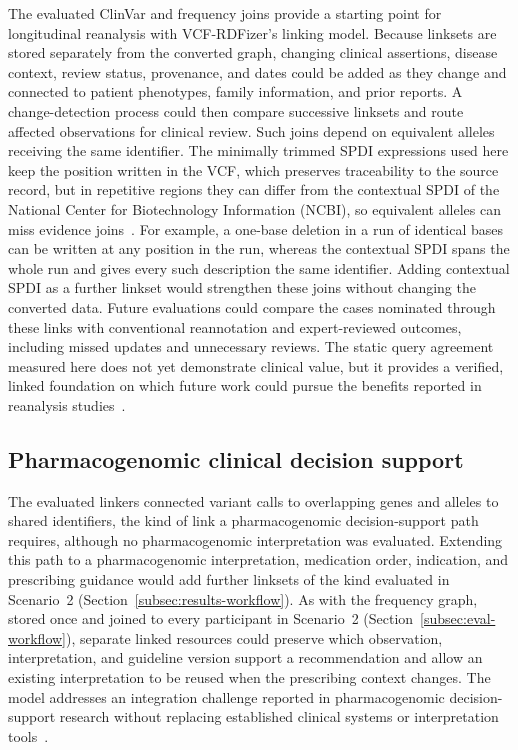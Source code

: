 \documentclass[pdflatex,sn-mathphys-num,referee]{sn-jnl}
\begin{document}
The evaluated ClinVar and frequency joins provide a starting point for longitudinal reanalysis with VCF-RDFizer's linking model.
Because linksets are stored separately from the converted graph, changing clinical assertions, disease context, review status, provenance, and dates could be added as they change and connected to patient phenotypes, family information, and prior reports.
A change-detection process could then compare successive linksets and route affected observations for clinical review.
Such joins depend on equivalent alleles receiving the same identifier.
The minimally trimmed SPDI expressions used here keep the position written in the VCF, which preserves traceability to the source record, but in repetitive regions they can differ from the contextual SPDI of the National Center for Biotechnology Information (NCBI), so equivalent alleles can miss evidence joins~\cite{holmes2020spdi}.
For example, a one-base deletion in a run of identical bases can be written at any position in the run, whereas the contextual SPDI spans the whole run and gives every such description the same identifier.
Adding contextual SPDI as a further linkset would strengthen these joins without changing the converted data.
Future evaluations could compare the cases nominated through these links with conventional reannotation and expert-reviewed outcomes, including missed updates and unnecessary reviews.
The static query agreement measured here does not yet demonstrate clinical value, but it provides a verified, linked foundation on which future work could pursue the benefits reported in reanalysis studies~\cite{hiatt2018systematic}.

\subsection{Pharmacogenomic clinical decision support}\label{subsec:disc-pgx}
The evaluated linkers connected variant calls to overlapping genes and alleles to shared identifiers, the kind of link a pharmacogenomic decision-support path requires, although no pharmacogenomic interpretation was evaluated.
Extending this path to a pharmacogenomic interpretation, medication order, indication, and prescribing guidance would add further linksets of the kind evaluated in Scenario~2 (Section~\ref{subsec:results-workflow}).
As with the frequency graph, stored once and joined to every participant in Scenario~2 (Section~\ref{subsec:eval-workflow}), separate linked resources could preserve which observation, interpretation, and guideline version support a recommendation and allow an existing interpretation to be reused when the prescribing context changes.
The model addresses an integration challenge reported in pharmacogenomic decision-support research without replacing established clinical systems or interpretation tools~\cite{wake2022pgx,johnson2024genetically}.
\end{document}
